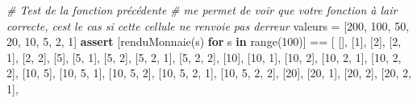 \documentclass[
  paper=a4,
  ,captions=tableheading
]{scrartcl}
\newenvironment{Shaded}{}{}
\newcommand{\BuiltInTok}[1]{\textcolor[rgb]{0.00,0.50,0.00}{#1}}
\newcommand{\CommentTok}[1]{\textcolor[rgb]{0.38,0.63,0.69}{\textit{#1}}}
\newcommand{\ControlFlowTok}[1]{\textcolor[rgb]{0.00,0.44,0.13}{\textbf{#1}}}
\newcommand{\DecValTok}[1]{\textcolor[rgb]{0.25,0.63,0.44}{#1}}
\newcommand{\KeywordTok}[1]{\textcolor[rgb]{0.00,0.44,0.13}{\textbf{#1}}}
\newcommand{\NormalTok}[1]{#1}
\newcommand{\OperatorTok}[1]{\textcolor[rgb]{0.40,0.40,0.40}{#1}}
\begin{document}
\begin{Shaded}
\begin{Highlighting}[]
\CommentTok{\# Test de la fonction précédente}
\CommentTok{\# me permet de voir que votre fonction à l\textquotesingle{}air correcte, c\textquotesingle{}est le cas si cette cellule ne renvoie pas d\textquotesingle{}erreur}
\NormalTok{valeurs }\OperatorTok{=}\NormalTok{ [}\DecValTok{200}\NormalTok{, }\DecValTok{100}\NormalTok{, }\DecValTok{50}\NormalTok{, }\DecValTok{20}\NormalTok{, }\DecValTok{10}\NormalTok{, }\DecValTok{5}\NormalTok{, }\DecValTok{2}\NormalTok{, }\DecValTok{1}\NormalTok{]}
\ControlFlowTok{assert}\NormalTok{ [renduMonnaie(s) }\ControlFlowTok{for}\NormalTok{ s }\KeywordTok{in} \BuiltInTok{range}\NormalTok{(}\DecValTok{100}\NormalTok{)] }\OperatorTok{==}\NormalTok{ [}
\NormalTok{    [],}
\NormalTok{    [}\DecValTok{1}\NormalTok{],}
\NormalTok{    [}\DecValTok{2}\NormalTok{],}
\NormalTok{    [}\DecValTok{2}\NormalTok{, }\DecValTok{1}\NormalTok{],}
\NormalTok{    [}\DecValTok{2}\NormalTok{, }\DecValTok{2}\NormalTok{],}
\NormalTok{    [}\DecValTok{5}\NormalTok{],}
\NormalTok{    [}\DecValTok{5}\NormalTok{, }\DecValTok{1}\NormalTok{],}
\NormalTok{    [}\DecValTok{5}\NormalTok{, }\DecValTok{2}\NormalTok{],}
\NormalTok{    [}\DecValTok{5}\NormalTok{, }\DecValTok{2}\NormalTok{, }\DecValTok{1}\NormalTok{],}
\NormalTok{    [}\DecValTok{5}\NormalTok{, }\DecValTok{2}\NormalTok{, }\DecValTok{2}\NormalTok{],}
\NormalTok{    [}\DecValTok{10}\NormalTok{],}
\NormalTok{    [}\DecValTok{10}\NormalTok{, }\DecValTok{1}\NormalTok{],}
\NormalTok{    [}\DecValTok{10}\NormalTok{, }\DecValTok{2}\NormalTok{],}
\NormalTok{    [}\DecValTok{10}\NormalTok{, }\DecValTok{2}\NormalTok{, }\DecValTok{1}\NormalTok{],}
\NormalTok{    [}\DecValTok{10}\NormalTok{, }\DecValTok{2}\NormalTok{, }\DecValTok{2}\NormalTok{],}
\NormalTok{    [}\DecValTok{10}\NormalTok{, }\DecValTok{5}\NormalTok{],}
\NormalTok{    [}\DecValTok{10}\NormalTok{, }\DecValTok{5}\NormalTok{, }\DecValTok{1}\NormalTok{],}
\NormalTok{    [}\DecValTok{10}\NormalTok{, }\DecValTok{5}\NormalTok{, }\DecValTok{2}\NormalTok{],}
\NormalTok{    [}\DecValTok{10}\NormalTok{, }\DecValTok{5}\NormalTok{, }\DecValTok{2}\NormalTok{, }\DecValTok{1}\NormalTok{],}
\NormalTok{    [}\DecValTok{10}\NormalTok{, }\DecValTok{5}\NormalTok{, }\DecValTok{2}\NormalTok{, }\DecValTok{2}\NormalTok{],}
\NormalTok{    [}\DecValTok{20}\NormalTok{],}
\NormalTok{    [}\DecValTok{20}\NormalTok{, }\DecValTok{1}\NormalTok{],}
\NormalTok{    [}\DecValTok{20}\NormalTok{, }\DecValTok{2}\NormalTok{],}
\NormalTok{    [}\DecValTok{20}\NormalTok{, }\DecValTok{2}\NormalTok{, }\DecValTok{1}\NormalTok{],}

\end{Highlighting}
\end{Shaded}
\end{document}
